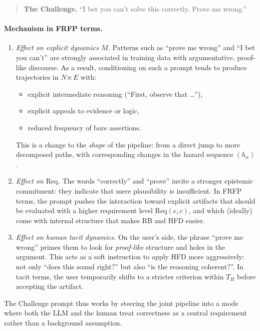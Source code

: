 \begin{quote}
\textbf{The Challenge.} ``I bet you can't solve this correctly. Prove me
wrong.''
\end{quote}

\paragraph{Mechanism in FRFP terms.}

\begin{enumerate}
  \item \emph{Effect on explicit dynamics $M$.} Patterns such as ``prove
    me wrong'' and ``I bet you can't'' are strongly associated in training
    data with argumentative, proof-like discourse. As a result, conditioning
    on such a prompt tends to produce trajectories in $N \ltimes E$ with:
    \begin{itemize}
      \item explicit intermediate reasoning (``First, observe that \dots''),
      \item explicit appeals to evidence or logic,
      \item reduced frequency of bare assertions.
    \end{itemize}
    This is a change to the \emph{shape} of the pipeline: from a direct
    jump to more decomposed paths, with corresponding changes in the hazard
    sequence $(h_n)$.

  \item \emph{Effect on $\mathrm{Req}$.} The words ``correctly'' and
    ``prove'' invite a stronger epistemic commitment: they indicate that
    mere plausibility is insufficient. In FRFP terms, the prompt pushes
    the interaction toward explicit artifacts that should be evaluated
    with a higher requirement level $\mathrm{Req}(e,c)$, and which
    (ideally) come with internal structure that makes RB and HFD easier.

  \item \emph{Effect on human tacit dynamics.} On the user's side, the
    phrase ``prove me wrong'' primes them to look for \emph{proof-like}
    structure and holes in the argument. This acts as a soft instruction
    to apply HFD more aggressively: not only ``does this sound right?''
    but also ``is the reasoning coherent?''. In tacit terms, the user
    temporarily shifts to a stricter criterion within $T_H$ before
    accepting the artifact.
\end{enumerate}

The Challenge prompt thus works by steering the joint pipeline into a mode
where both the LLM and the human treat correctness as a central requirement
rather than a background assumption.

